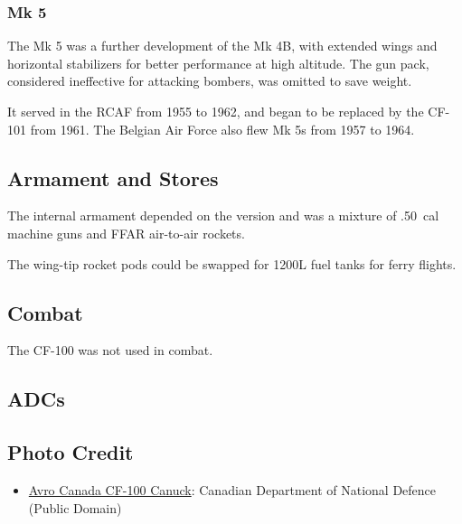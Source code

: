 \subsubsection{Mk 5}

The Mk 5 was a further development of the Mk 4B, with extended wings and horizontal stabilizers for better performance at high altitude. The gun pack, considered ineffective for attacking bombers, was omitted to save weight.

It served in the RCAF from 1955 to 1962, and began to be replaced by the CF-101 from 1961. The Belgian Air Force also flew Mk 5s from 1957 to 1964.

\subsection{Armament and Stores}

The internal armament depended on the version and was a mixture of .50~cal machine guns and FFAR air-to-air rockets.

The wing-tip rocket pods could be swapped for 1200L fuel tanks for ferry flights.

\subsection{Combat}

The CF-100 was not used in combat.

\subsection{ADCs}
\begin{adclist}
\end{adclist}

\subsection{Photo Credit}
\begin{itemize}\raggedright
    \item \href{https://commons.wikimedia.org/wiki/File:CF-100s_423_Sqn.jpg}{Avro Canada CF-100 Canuck}: Canadian Department of National Defence (Public Domain)
\end{itemize}

